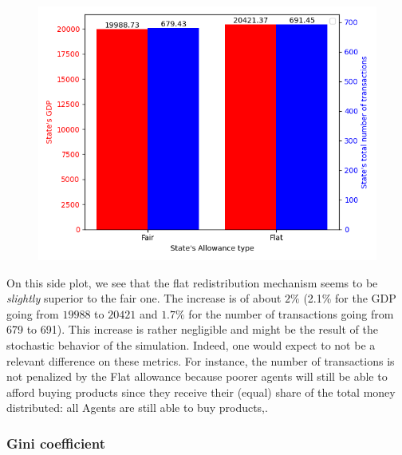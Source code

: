 {{{{{{        \begin{figure}
            \includegraphics[width=\linewidth]{img/exp/8_1.png}
        \end{figure} 
        { On this side plot, we see that the flat redistribution mechanism seems to be \emph{slightly} superior to the fair one. The increase is of about $2\%$ (2.1\% for the GDP going from $19988$ to $20421$ and $1.7\%$ for the number of transactions going from 679 to 691). This increase is rather negligible and might be the result of the stochastic behavior of the simulation. Indeed, one would expect to not be a relevant difference on these metrics. For instance, the number of transactions is not penalized by the Flat allowance because poorer agents will still be able to afford buying products since they receive their (equal) share of the total money distributed: all Agents are still able to buy products,.
        \par

        \subsubsection{Gini coefficient}

}}}}}}}
